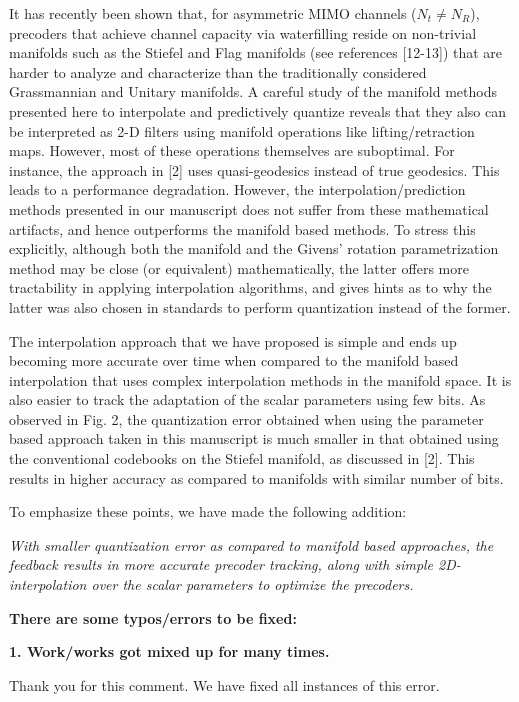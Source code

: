 \documentclass[12pt]{letter}
\begin{document}
It has recently been shown that, for asymmetric MIMO channels
($N_t\neq N_R$), precoders that achieve channel capacity via
waterfilling reside on non-trivial manifolds such as the Stiefel and
Flag manifolds (see references [12-13]) that are harder to analyze and
characterize than the traditionally considered Grassmannian and
Unitary manifolds. A careful study of the manifold methods presented
here to interpolate and predictively quantize reveals that they also
can be interpreted as 2-D filters using manifold operations like
lifting/retraction maps. However, most of these operations themselves
are suboptimal. For instance, the approach in [2] uses quasi-geodesics
instead of true geodesics. This leads to a performance
degradation. However, the interpolation/prediction methods presented
in our manuscript does not suffer from these mathematical artifacts,
and hence outperforms the manifold based methods. To stress this
explicitly, although both the manifold and the Givens' rotation
parametrization method may be close (or equivalent) mathematically,
the latter offers more tractability in applying interpolation
algorithms, and gives hints as to why the latter was also chosen in
standards to perform quantization instead of the former.

The interpolation approach that we have proposed is simple and ends up
becoming more accurate over time when compared to the manifold based
interpolation that uses complex interpolation methods in the manifold
space. It is also easier to track the adaptation of the scalar
parameters using few bits. As observed in Fig. 2, the quantization
error obtained when using the parameter based approach taken in this
manuscript is much smaller in that obtained using the conventional
codebooks on the Stiefel manifold, as discussed in [2]. This results
in higher accuracy as compared to manifolds with similar number of
bits.

To emphasize these points, we have made the following addition:

\emph{With smaller
quantization error as compared to manifold based approaches, the
feedback results in more accurate precoder tracking, along with simple
2D-interpolation over the scalar parameters to optimize the precoders.}

\textbf{There are some typos/errors to be fixed:}

\textbf{1. Work/works got mixed up for many times.}

Thank you for this comment. We have fixed all instances of this error.
\end{document}
